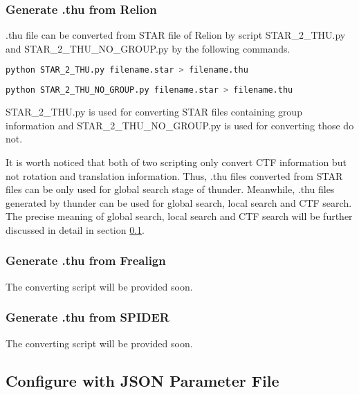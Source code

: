 \documentclass{article}
\begin{document}
            \subsubsection{Generate \textsf{.thu} from Relion}
            
            \textsf{.thu} file can be converted from STAR file of Relion by script \textsf{STAR\_2\_THU.py} and \textsf{STAR\_2\_THU\_NO\_GROUP.py} by the following commands.
               
            \begin{lstlisting}[language={sh}]
python STAR_2_THU.py filename.star > filename.thu
            \end{lstlisting}
            
            \begin{lstlisting}[language={sh}]
python STAR_2_THU_NO_GROUP.py filename.star > filename.thu
            \end{lstlisting}
            
            \textsf{STAR\_2\_THU.py} is used for converting STAR files containing group information and \textsf{STAR\_2\_THU\_NO\_GROUP.py} is used for converting those do not.
            
            It is worth noticed that both of two scripting only convert CTF information but not rotation and translation information. Thus, \textsf{.thu} files converted from STAR files can be only used for global search stage of \textsf{thunder}. Meanwhile, \textsf{.thu} files generated by \textsf{thunder} can be used for global search, local search and CTF search. The precise meaning of global search, local search and CTF search will be further discussed in detail in section \ref{sec:JSON}.
            
            \subsubsection{Generate \textsf{.thu} from Frealign}
            
            The converting script will be provided soon.
            
            \subsubsection{Generate \textsf{.thu} from SPIDER}
            
            The converting script will be provided soon.
    
        \subsection{Configure with JSON Parameter File}\label{sec:JSON}
        
\end{document}
